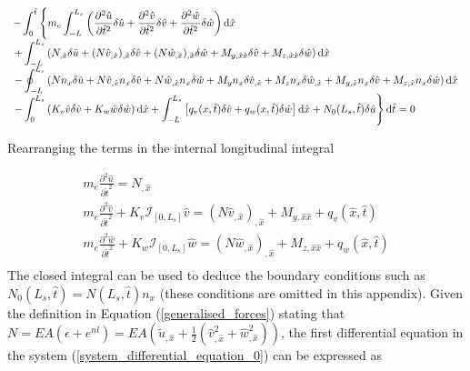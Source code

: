 \documentclass[3p,doublespacing,authoryear,11pt]{elsarticle} %
\begin{document}
\begin{equation}\label{Hamilton_pple_2}
  \begin{array}{l } 
\displaystyle - \int_{0}^{\hat{t}}\left \{ m_e \int_{-L}^{L_s} \left( \frac{\partial^2 \hat{u}}{\partial \hat{t}^2} \delta \hat{u} +  \frac{\partial^2\hat{v}}{\partial \hat{t}^2} \delta \hat{v} +  \frac{\partial^2 \hat{w}}{\partial \hat{t}^2} \delta \hat{w} \right)\textup{d} \hat{x}   \right .\\
\displaystyle \left.  + \int_{-L}^{L_s} \left( N_{,\hat{x}} \delta  \tilde{u} + (N \hat{v}_{,\hat{x}})_{,\hat{x}}  \delta \hat{v}  + (N \hat{w}_{,\hat{x}})_{,\hat{x}}  \delta \hat{w}   + M_{y,\hat{x}\hat{x}} \delta \hat{v} + M_{z,\hat{x}\hat{x}} \delta \hat{w} \right) \textup{d} \hat{x} \right .\\
\displaystyle \left.  - \oint_{-L}^{L_s} \left( N n_x \delta  \tilde{u} + N \hat{v}_{,\hat{x}} n_x  \delta \hat{v}  + N \hat{w}_{,\hat{x}} n_x  \delta \hat{w}   + M_y n_x \delta \hat{v}_{,\hat{x}} + M_z n_x \delta \hat{w}_{,\hat{x}}  + M_{y,\hat{x}} n_x \delta \hat{v} + M_{z,\hat{x}} n_x \delta \hat{w}\right) \textup{d} \hat{x} \right .\\
\displaystyle \left.- \int_{0}^{L_s}\left ( K_v \hat{v} \delta \hat{v}   + K_w \hat{w} \delta \hat{w}  \right )\textup{d}\hat{x} + \int_{-L}^{L_s}\left [q_v( x,\hat{t}) \delta \hat{v} + q_w( x,\hat{t}) \delta \hat{w}  \right ] \textup{d}\hat{x} + N_0 (L_s, \hat{t}) \delta \hat{u} \right \}\textup{d}\hat{t}=0  %
  \end{array}  
\end{equation}
 
Rearranging the terms in the internal longitudinal integral 
 
  \begin{equation}\label{system_differential_equation_0}
  \begin{array}{l } 
  \displaystyle  m_e  \frac{\partial^2 \hat{u}}{\partial \hat{t}^2} =  N_{,\hat{x}} \\ 
  \displaystyle m_e  \frac{\partial^2 \hat{v}}{\partial \hat{t}^2} + K_v \mathcal{I}_{[0,L_s]} \hat{v} = (N \hat{v}_{,\hat{x}})_{,\hat{x}}  + M_{y,\hat{x}\hat{x}}  + q_v(\hat{x},\hat{t}) \\ 
  \displaystyle m_e  \frac{\partial^2 \hat{w}}{\partial \hat{t}^2} + K_w \mathcal{I}_{[0,L_s]} \hat{w} = (N \hat{w}_{,\hat{x}})_{,\hat{x}}  + M_{z,\hat{x}\hat{x}} + q_w(\hat{x},\hat{t}) \\ 
  \end{array}  
\end{equation}
The closed integral can be used to deduce the boundary conditions such as $N_0 (L_s,\hat{t})  = N(L_s,\hat{t}) n_x$ (these conditions are omitted in this appendix). Given the definition in Equation (\ref{generalised_forces}) stating that $N = E A (\epsilon + e^{nl} ) = E A(\tilde{u}_{,\hat{x}} + \frac{1}{2} \left( \hat{v}_{,\hat{x}}^2 + \hat{w}_{,\hat{x}}^2 \right))$, the first differential equation in the system (\ref{system_differential_equation_0}) can be expressed as
\end{document}

